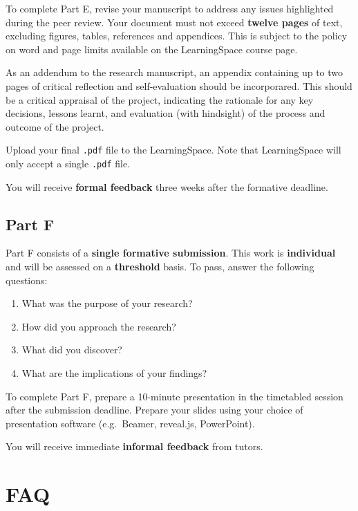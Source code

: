 To complete Part E, revise your manuscript to address any issues highlighted during the peer review.
Your document must not exceed \textbf{twelve pages} of text, excluding figures, tables, references and appendices.
This is subject to the policy on word and page limits available on the LearningSpace course page.

As an addendum to the research manuscript, an appendix containing up to two pages of critical reflection and self-evaluation should be incorporared. 
This should be a critical appraisal of the project, indicating the rationale for any key decisions, lessons learnt, and evaluation (with hindsight) of the process
and outcome of the project. 

Upload your final \texttt{.pdf} file to the LearningSpace.
Note that LearningSpace will only accept a single \texttt{.pdf} file.

You will receive \textbf{formal feedback} three weeks after the formative deadline.

\subsection*{Part F}

Part F consists of a \textbf{single formative submission}.
This work is \textbf{individual} and will be assessed on a \textbf{threshold} basis.
To pass, answer the following questions:

\begin{enumerate}[label=(\roman*)]
	\item What was the purpose of your research?
	\item How did you approach the research?
	\item What did you discover?
	\item What are the implications of your findings?
\end{enumerate}

To complete Part F, prepare a 10-minute presentation in the timetabled session after the submission deadline.
Prepare your slides using your choice of presentation software (e.g.\ Beamer, reveal.js, PowerPoint).

You will receive immediate \textbf{informal feedback} from tutors.

\section*{FAQ}

